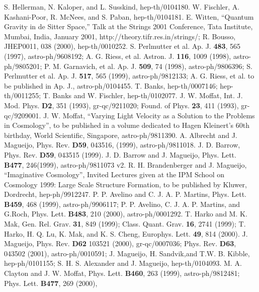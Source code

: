\documentclass[a4paper,12pt]{article}
\begin{document}
\begin{thebibliography}{100}
 S. Hellerman, N. Kaloper, and L. Susskind,
hep-th/0104180.
 W. Fischler, A. Kashani-Poor, R. McNees, and S. Paban,
hep-th/0104181.
 E. Witten, ``Quantum Gravity in de Sitter Space,'' Talk at
the Strings 2001 Conference, Tata Institute, Mumbai, India, January 2001,
http://theory.tifr.res.in/strings/; R. Bousso, JHEP0011, 038 (2000),
hep-th/0010252.
 S. Perlmutter et al. Ap. J. {\bf 483},
565 (1997), astro-ph/9608192; A. G. Riess, et al. Astron. J. {\bf 116},
1009 (1998), astro-ph/9805201; P. M. Garnavich, et al. Ap. J. {\bf 509}, 74
(1998), astro-ph/9806396; S. Perlmutter et al. Ap. J. {\bf 517}, 565
(1999), astro-ph/9812133; A. G. Riess, et al. to be published in Ap. J.,
astro-ph/0104455.
 T. Banks, hep-th/0007146; hep-th/0011255;
T. Banks and W. Fischler, hep-th/0102077.
 J. W. Moffat,
Int. J. Mod. Phys. {\bf D2}, 351 (1993), gr-qc/9211020; Found. of Phys.
{\bf 23}, 411 (1993), gr-qc/9209001.
 J. W. Moffat,
``Varying Light Velocity as a Solution to the Problems in Cosmology'', to
be published in a volume dedicated to Hagen Kleinert's 60th birthday, World
Scientific, Singapore, astro-ph/9811390.
 A. Albrecht and
J. Magueijo, Phys. Rev. {\bf D59}, 043516, (1999), astro-ph/9811018.
 J. D. Barrow, Phys. Rev. {\bf D59}, 043515 (1999).
 J. D. Barrow and J. Magueijo, Phys. Lett. {\bf B477},
246(1999), astro-ph/9811073 v2.
 R. H. Brandenberger
and J. Magueijo, ``Imaginative Cosmology'', Invited Lectures given at the
IPM School on Cosmology 1999: Large Scale Structure Formation, to be
published by Kluwer, Dordrecht, hep-ph/9912247.
 P. P.
Avelino and C. J. A. P. Martins, Phys. Lett. {\bf B459}, 468 (1999),
astro-ph/9906117; P. P. Avelino, C. J. A. P. Martins, and G.Roch, Phys.
Lett. {\bf B483}, 210 (2000), astro-ph/0001292.
 T. Harko and
M. K. Mak, Gen. Rel. Grav. {\bf 31}, 849 (1999); Class. Quant. Grav. {\bf
16}, 2741 (1999); T. Harko, H. Q. Lu, K. Mak, and K. S. Cheng, Europhys.
Lett. {\bf 49}, 814 (2000).
 J. Magueijo, Phys. Rev. {\bf
D62} 103521 (2000), gr-qc/0007036; Phys. Rev. {\bf D63}, 043502 (2001),
astro-ph/0010591; J. Magueijo, H. Sandvik,and T.W. B. Kibble,
hep-ph/0101155; S. H. S. Alexander and J. Magueijo, hep-th/0104093.
 M. A. Clayton and J. W. Moffat, Phys. Lett. {\bf B460},
263 (1999), astro-ph/9812481; Phys. Lett. {\bf B477}, 269 (2000),

\end{thebibliography}
\end{document}
